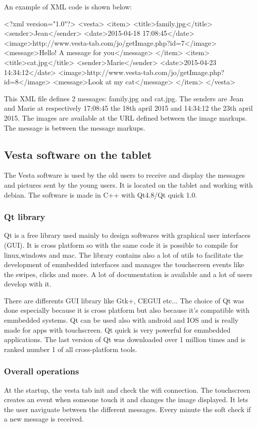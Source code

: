 An example of XML code is shown below:

<?xml version="1.0"?>
<vesta>
  <item>
    <title>family.jpg</title>
    <sender>Jean</sender>
    <date>2015-04-18 17:08:45</date>    
    <image>http://www.vesta-tab.com/jo/getImage.php?id=7</image>
    <message>Hello! A message for you</message>
  </item>
  <item>
    <title>cat.jpg</title>
    <sender>Marie</sender>
    <date>2015-04-23 14:34:12</date>
    <image>http://www.vesta-tab.com/jo/getImage.php?id=8</image>
    <message>Look at my cat</message>
  </item>
</vesta>

This XML file defines 2 messages: family.jpg and cat.jpg. The senders are Jean and Marie at respectively 17:08:45 the 18th april 2015 and 14:34:12 the 23th april 2015. The images are available at the URL defined between the image markups. The message is between the message markups.

\subsection{Vesta software on the tablet}
The Vesta software is used by the old users to receive and display the messages and pictures sent by the young users. It is located on the tablet and working with debian. The software is made in C++ with Qt4.8/Qt quick 1.0.

\subsubsection{Qt library}
Qt is a free library used mainly to design softwares with graphical user interfaces (GUI). It is cross platform so with the same code it is possible to compile for linux,windows and mac.
The library contains also a lot of utils to facilitate the development of emmbedded interfaces and manages the touchscreen events like the swipes, clicks and more. A lot of documentation is available and a lot of users develop with it.

There are differents GUI library like Gtk+, CEGUI etc... The choice of Qt was done especially because it is cross platform but also because it's compatible with emmbedded systems. Qt can be used also with android and IOS and is really made for apps with touchscreen. Qt quick is very powerful for emmbedded applications. The last version of Qt was downloaded over 1 million times and is ranked number 1 of all cross-platform tools.

\subsubsection{Overall operations}
At the startup, the vesta tab init and check the wifi connection. The touchscreen creates an event when someone touch it and changes the image displayed. It lets the user naviguate between the different messages. Every minute the soft check if a new message is received.

